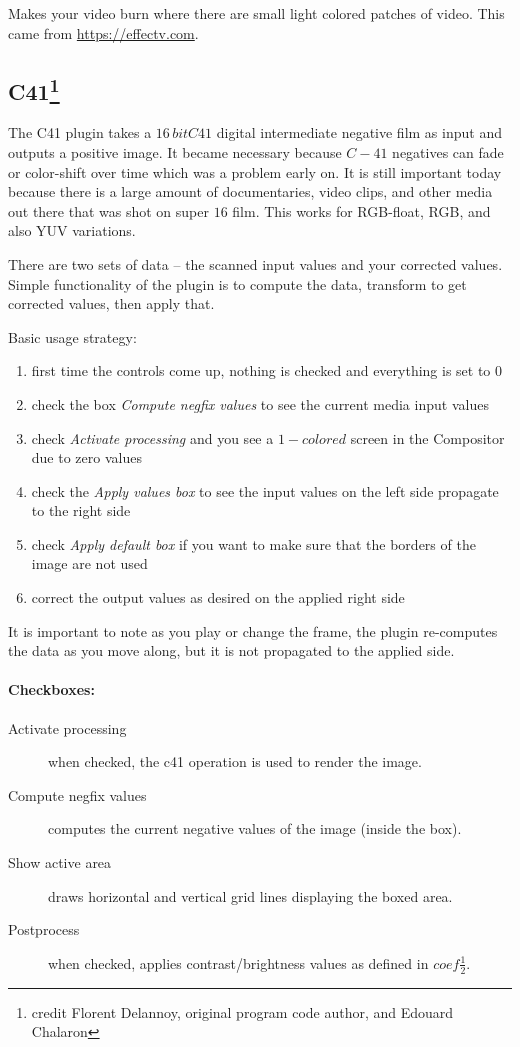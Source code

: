 Makes your video burn where there are small light colored patches of video. This came from \url{https://effectv.com}.

\subsection[C41]{C41\protect\footnote{credit Florent Delannoy, original program code author, and Edouard Chalaron}}%
\label{sub:c41}

The C41 plugin takes a $16\,bit C41$ digital intermediate negative film as input and outputs a positive image. It became necessary because $C-41$ negatives can fade or color-shift over time which was a problem early on. It is still important today because there is a large amount of documentaries, video clips, and other media out there that was shot on super $16$ film. This works for RGB-float, RGB, and also YUV variations.

There are two sets of data -- the scanned input values and your corrected values. Simple functionality of the plugin is to compute the data, transform to get corrected values, then apply that.

Basic usage strategy:
\begin{enumerate}
    \item first time the controls come up, nothing is checked and everything is set to $0$
    \item check the box \textit{Compute negfix values} to see the current media input values
    \item check \textit{Activate processing} and you see a $1-colored$ screen in the Compositor due to zero values
    \item check the \textit{Apply values box} to see the input values on the left side propagate to the right side
    \item check \textit{Apply default box} if you want to make sure that the borders of the image are not used
    \item correct the output values as desired on the applied right side
\end{enumerate}

It is important to note as you play or change the frame, the plugin re-computes the data as you move along, but it is not propagated to the applied side.


\paragraph{Checkboxes:}
    \begin{description}
        \item[Activate processing] when checked, the c41 operation is used to render the image.
        \item[Compute negfix values] computes the current negative values of the image (inside the box).
        \item[Show active area] draws horizontal and vertical grid lines displaying the boxed area.
        \item[Postprocess] when checked, applies contrast/brightness values as defined in $coef\frac{1}{2}$.
    \end{description}
